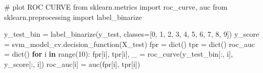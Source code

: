 \documentclass[
  letterpaper,
  DIV=11,
  numbers=noendperiod]{scrartcl}
\newenvironment{Shaded}{\begin{snugshade}}{\end{snugshade}}
\newcommand{\BuiltInTok}[1]{\textcolor[rgb]{0.00,0.23,0.31}{#1}}
\newcommand{\CommentTok}[1]{\textcolor[rgb]{0.37,0.37,0.37}{#1}}
\newcommand{\ControlFlowTok}[1]{\textcolor[rgb]{0.00,0.23,0.31}{\textbf{#1}}}
\newcommand{\DecValTok}[1]{\textcolor[rgb]{0.68,0.00,0.00}{#1}}
\newcommand{\ImportTok}[1]{\textcolor[rgb]{0.00,0.46,0.62}{#1}}
\newcommand{\KeywordTok}[1]{\textcolor[rgb]{0.00,0.23,0.31}{\textbf{#1}}}
\newcommand{\NormalTok}[1]{\textcolor[rgb]{0.00,0.23,0.31}{#1}}
\newcommand{\OperatorTok}[1]{\textcolor[rgb]{0.37,0.37,0.37}{#1}}
\begin{document}
\begin{Shaded}
\begin{Highlighting}[]
\CommentTok{\# plot ROC CURVE}
\ImportTok{from}\NormalTok{ sklearn.metrics }\ImportTok{import}\NormalTok{ roc\_curve, auc}
\ImportTok{from}\NormalTok{ sklearn.preprocessing }\ImportTok{import}\NormalTok{ label\_binarize}

\NormalTok{y\_test\_bin }\OperatorTok{=}\NormalTok{ label\_binarize(y\_test, classes}\OperatorTok{=}\NormalTok{[}\DecValTok{0}\NormalTok{, }\DecValTok{1}\NormalTok{, }\DecValTok{2}\NormalTok{, }\DecValTok{3}\NormalTok{, }\DecValTok{4}\NormalTok{, }\DecValTok{5}\NormalTok{, }\DecValTok{6}\NormalTok{, }\DecValTok{7}\NormalTok{, }\DecValTok{8}\NormalTok{, }\DecValTok{9}\NormalTok{])}
\NormalTok{y\_score }\OperatorTok{=}\NormalTok{ svm\_model\_cv.decision\_function(X\_test)}
\NormalTok{fpr }\OperatorTok{=} \BuiltInTok{dict}\NormalTok{()}
\NormalTok{tpr }\OperatorTok{=} \BuiltInTok{dict}\NormalTok{()}
\NormalTok{roc\_auc }\OperatorTok{=} \BuiltInTok{dict}\NormalTok{()}
\ControlFlowTok{for}\NormalTok{ i }\KeywordTok{in} \BuiltInTok{range}\NormalTok{(}\DecValTok{10}\NormalTok{):}
\NormalTok{    fpr[i], tpr[i], \_ }\OperatorTok{=}\NormalTok{ roc\_curve(y\_test\_bin[:, i], y\_score[:, i])}
\NormalTok{    roc\_auc[i] }\OperatorTok{=}\NormalTok{ auc(fpr[i], tpr[i])}


\end{Highlighting}
\end{Shaded}
\end{document}
